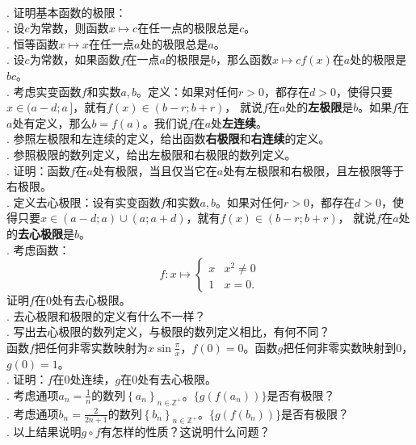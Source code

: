 \documentclass[12pt,UTF8,fontset=none]{ctexbook}
\begin{document}
\begin{xt}
    \mbox{} \\
    . 证明基本函数的极限：\\
    . 设$c$为常数，则函数$x\mapsto c$在任一点的极限总是$c$。\\
    . 恒等函数$x\mapsto x$在任一点$a$处的极限总是$a$。\\
    . 设$c$为常数，如果函数$f$在一点$a$的极限是$b$，那么函数$x\mapsto cf(x)$在$a$处的极限是$bc$。\\
    . 考虑实变函数$f$和实数$a, b$。定义：如果对任何$r>0$，都存在$d>0$，使得只要$x\in(a-d;a\,]$，就有$f(x)\in(b-r;b+r)$，
    就说$f$在$a$处的\textbf{左极限}是$b$。如果$f$在$a$处有定义，那么$b=f(a)$。我们说$f$在$a$处\textbf{左连续}。\\
    . 参照左极限和左连续的定义，给出函数\textbf{右极限}和\textbf{右连续}的定义。\\
    . 参照极限的数列定义，给出左极限和右极限的数列定义。\\
    . 证明：函数$f$在$a$处有极限，当且仅当它在$a$处有左极限和右极限，且左极限等于右极限。\\
    . 定义去心极限：设有实变函数$f$和实数$a, b$。如果对任何$r>0$，都存在$d>0$，使得只要$x\in(a-d;a)\cup(a;a+d)$，就有$f(x)\in(b-r;b+r)$，
    就说$f$在$a$处的\textbf{去心极限}是$b$。\\
    . 考虑函数：
    $$f:x\mapsto \begin{cases}
    x & x^2 \neq 0 \\
    1 & x = 0.
    \end{cases}
    $$
    \indent \qquad 证明$f$在$0$处有去心极限。\\
    . 去心极限和极限的定义有什么不一样？\\
    . 写出去心极限的数列定义，与极限的数列定义相比，有何不同？\\
    \indent \qquad 函数$f$把任何非零实数映射为$\displaystyle x\sin{\frac{\pi}{x}}$，$f(0) = 0$。函数$g$把任何非零实数映射到$0$，$g(0) = 1$。\\
    . 证明：$f$在$0$处连续，$g$在$0$处有去心极限。\\
    . 考虑通项$a_n = \frac{1}{n}$的数列$\left\{a_n\right\}_{n\in\mathbb{Z}^+}$。$\{g(f(a_n))\}$是否有极限？\\
    . 考虑通项$b_n = \frac{2}{2n+1}$的数列$\left\{b_n\right\}_{n\in\mathbb{Z}^+}$。$\{g(f(b_n))\}$是否有极限？\\
    . 以上结果说明$g\circ f$有怎样的性质？这说明什么问题？
\end{xt}
\end{document}
